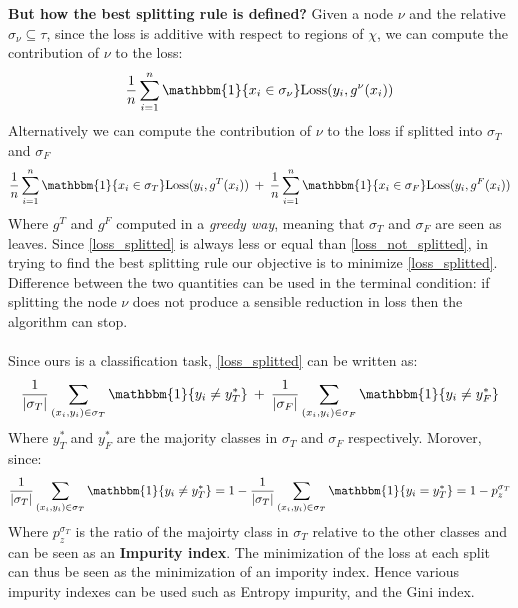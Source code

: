 \textbf{But how the best splitting rule is defined?} Given a node \(\nu\) and the relative \(\sigma_\nu \subseteq \tau\), since the loss is additive with respect to regions of \(\chi\), we can compute the contribution of \(\nu\) to the loss:
\begin{equation}
    \label{loss_not_splitted}
    \frac{1}{n}  \sum \limits_{i= 1}^{n} \mathbbm{1}\{x_i \in \sigma_\nu\}\text{Loss}(y_i, g^\nu(x_i))
\end{equation}
Alternatively we can compute the contribution of \(\nu\) to the loss if splitted into \(\sigma_T\) and \(\sigma_F\)
\begin{equation}
    \label{loss_splitted}
    \frac{1}{n}  \sum \limits_{i= 1}^{n} \mathbbm{1}\{x_i \in \sigma_T\}\text{Loss}(y_i, g^T(x_i))\: +\: \frac{1}{n}  \sum \limits_{i= 1}^{n} \mathbbm{1}\{x_i \in \sigma_F\}\text{Loss}(y_i, g^F(x_i))
\end{equation}
Where \(g^T\) and \(g^F\) computed in a \textit{greedy way}, meaning that \(\sigma_T\) and \(\sigma_F\) are seen as leaves. Since \ref{loss_splitted} is always less or equal than \ref{loss_not_splitted}, in trying to find the best splitting rule our objective is to minimize \ref{loss_splitted}. Difference between the two quantities can be used in the terminal condition: if splitting the node \(\nu\) does not produce a sensible reduction in loss then the algorithm can stop. 
\\
\\
Since ours is a classification task, \ref{loss_splitted} can be written as:
\begin{equation}
    \frac{1}{|\sigma_T|}  \sum \limits_{(x_i, y_i) \in \sigma_T}^{} \mathbbm{1} \{y_i \neq y_T^*\}\: +\: \frac{1}{|\sigma_F|}  \sum \limits_{(x_i, y_i) \in \sigma_F}^{} \mathbbm{1} \{y_i \neq y_F^*\}
\end{equation}
Where \(y_T^*\) and \(y_F^*\) are the majority classes in \(\sigma_T\) and \(\sigma_F\) respectively. Morover, since:
\begin{equation}
    \frac{1}{|\sigma_T|}  \sum \limits_{(x_i, y_i) \in \sigma_T}^{} \mathbbm{1} \{y_i \neq y_T^*\} = 1 - \frac{1}{|\sigma_T|}  \sum \limits_{(x_i, y_i) \in \sigma_T}^{} \mathbbm{1} \{y_i = y_T^*\} = 1- p_z^{\sigma_T}
\end{equation}
Where \(p_z^{\sigma_T}\) is the ratio of the majoirty class in \(\sigma_T\) relative to the other classes and can be seen as an \textbf{Impurity index}. The minimization of the loss at each split can thus be seen as the minimization of an impority index. Hence various impurity indexes can be used such as Entropy impurity, and the Gini index.
